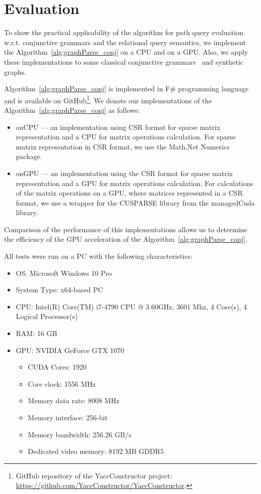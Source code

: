 \section{Evaluation}
To show the practical applicability of the algorithm for path query evaluation w.r.t. conjunctive grammars and the relational query semantics, we implement the Algorithm~\ref{alg:graphParse_conj} on a CPU and on a GPU. Also, we apply these implementations to some classical conjunctive grammars~\cite{okhotin2001conjunctive} and synthetic graphs.

Algorithm~\ref{alg:graphParse_conj} is implemented in F\# programming language~\cite{fsharp} and is available on GitHub\footnote{GitHub repository of the YaccConstructor project: \url{https://github.com/YaccConstructor/YaccConstructor}.}. We denote our implementations of the Algorithm~\ref{alg:graphParse_conj} as follows:
\begin{itemize}
	\item onCPU --- an implementation using CSR format for sparse matrix representation and a CPU for matrix operations calculation. For sparse matrix representation in CSR format, we use the Math.Net Numerics package.
	\item onGPU --- an implementation using the CSR format for sparse matrix representation and a GPU for matrix operations calculation. For calculations of the matrix operations on a GPU, where matrices represented in a CSR format, we use a wrapper for the CUSPARSE library from the managedCuda library.
\end{itemize}

Comparison of the performance of this implementations allows us to determine the efficiency of the GPU acceleration of the Algorithm~\ref{alg:graphParse_conj}.

All tests were run on a PC with the following characteristics:
\begin{itemize}
	\item OS: Microsoft Windows 10 Pro
	\item System Type: x64-based PC
	\item CPU: Intel(R) Core(TM) i7-4790 CPU @ 3.60GHz, 3601 Mhz, 4 Core(s), 4 Logical Processor(s)
	\item RAM: 16 GB
	\item GPU: NVIDIA GeForce GTX 1070
	\begin{itemize}
		\item CUDA Cores:		1920 
		\item Core clock:		1556 MHz 
		\item Memory data rate:	8008 MHz
		\item Memory interface:	256-bit 
		\item Memory bandwidth:	256.26 GB/s
		\item Dedicated video memory:	8192 MB GDDR5
	\end{itemize}
\end{itemize}

